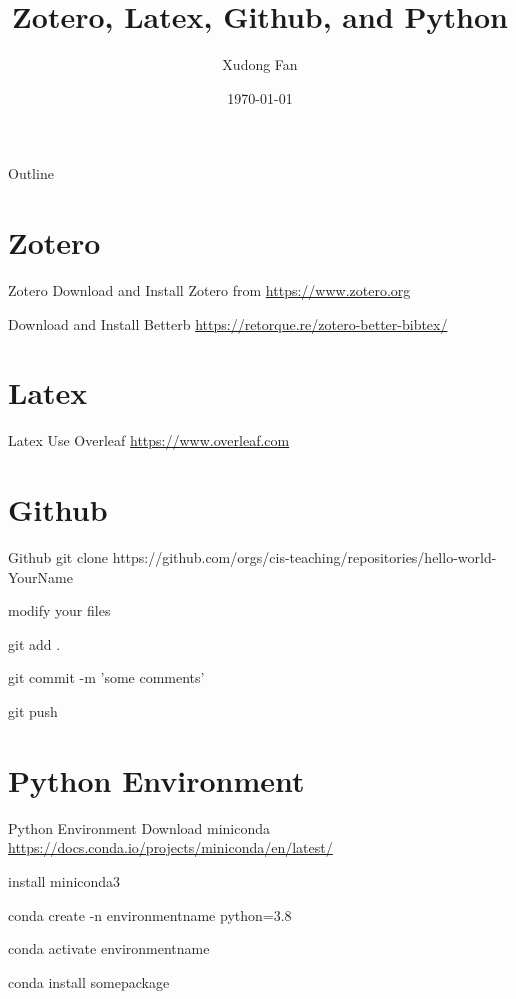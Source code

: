 \documentclass{beamer}
\title{Zotero, Latex, Github, and Python}
\author{Xudong Fan}
\date{\today}
\begin{document}
\begin{frame}
    \titlepage
\end{frame}

\logo{}


\begin{frame}{Outline}
    \tableofcontents
\end{frame}

\section{Zotero}
\begin{frame}{Zotero}
    Download and Install Zotero from \url{https://www.zotero.org}

    Download and Install Betterb \url{https://retorque.re/zotero-better-bibtex/}

\end{frame}

\section{Latex}
\begin{frame}{Latex}
    Use Overleaf \url{https://www.overleaf.com}

\end{frame}

\section{Github}
\begin{frame}{Github}
    git clone {https://github.com/orgs/cis-teaching/repositories/hello-world-YourName}

    modify your files

    git add .

    git commit -m 'some comments'

    git push
\end{frame}

\section{Python Environment}
\begin{frame}{Python Environment}
    Download miniconda \url{https://docs.conda.io/projects/miniconda/en/latest/}

    install miniconda3

    conda create -n environmentname python=3.8

    conda activate environmentname

    conda install somepackage

\end{frame}
\end{document}
